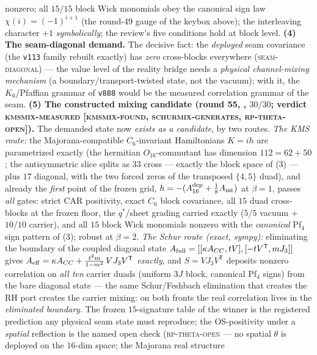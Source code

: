\documentclass[11pt,a4paper]{article}
\theoremstyle{definition}
\begin{document}
\begin{keybox}
nonzero; all $15/15$ block Wick monomials obey the canonical
sign law $\chi(i) = (-1)^{i+1}$ (the round-49 gauge of the
keybox above); the interleaving character $+1$
\emph{symbolically}; the review's five conditions hold at
block level.  \textbf{(4) The seam-diagonal demand.}  The
decisive fact: the \emph{deployed} seam covariance (the
\texttt{v113} family rebuilt exactly) has \emph{zero}
cross-blocks everywhere (\textsc{seam-diagonal}) --- the value
level of the reality bridge needs a \emph{physical
channel-mixing mechanism} (a boundary/transport-twisted state,
not the vacuum); with it, the $K_6$/Pfaffian grammar of
\texttt{v888} would be the measured correlation grammar of the
seam.  \textbf{(5) The constructed mixing candidate (round 55,
, $30/30$; verdict
\textsc{kmsmix-measured [kmsmix-found, schurmix-generates,
rp-theta-open]}).}  The demanded state now \emph{exists as a
candidate}, by two routes.  \emph{The KMS route:} the
Majorana-compatible $C_6$-invariant Hamiltonians $K = ih$ are
parametrized exactly (the hermitian $O_{16}$-commutant has
dimension $112 = 62 + 50$; the antisymmetric slice splits as
$33$ cross --- exactly the block space of (3) --- plus $17$
diagonal, with the two forced zeros of the transposed $\{4,5\}$
duad), and already the \emph{first} point of the frozen grid,
$h = -(A_{16}^{\rm dep} + \tfrac18 A_{\rm int})$ at $\beta = 1$,
passes \emph{all} gates: strict CAR positivity, exact $C_6$
block covariance, all $15$ duad cross-blocks at the frozen
floor, the $q^{*}$/sheet grading carried exactly ($5/5$ vacuum
$+$ $10/10$ carrier), and all $15$ block Wick monomials nonzero
with the \emph{canonical} Pf$_4$ sign pattern of (3); robust at
$\beta = 2$.  \emph{The Schur route (exact, sympy):} eliminating
the boundary of the coupled diagonal state $A_{\rm full} =
[[\kappa A_{CC}, tV], [-tV^{\mathsf T}, mJ_3]]$ gives $A_{\rm
eff} = \kappa A_{CC} + \tfrac{t^{2}m}{1 - m^{2}}\, V J_3
V^{\mathsf T}$ \emph{exactly}, and $S = V J_3 V^{\mathsf T}$
deposits nonzero correlation on \emph{all ten} carrier duads
(uniform $3J$ block, canonical Pf$_4$ signs) from the bare
diagonal state --- the same Schur/Feshbach elimination that
creates the RH port creates the carrier mixing: on both fronts
the real correlation lives in the \emph{eliminated boundary}.
The frozen $15$-signature table of the winner is the registered
prediction any physical seam state must reproduce; the
OS-positivity under a \emph{spatial} reflection is the named
open check (\textsc{rp-theta-open} --- no spatial $\theta$ is
deployed on the $16$-dim space; the Majorana real structure

\end{keybox}
\end{document}
